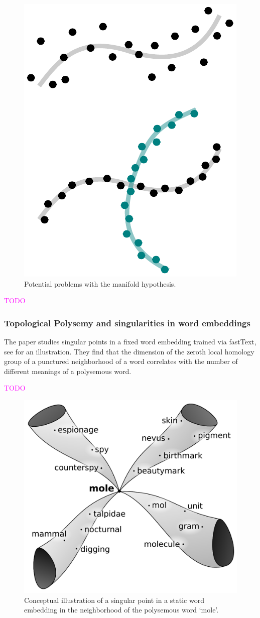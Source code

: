 \documentclass[11pt, a4paper]{amsart}
\begin{document}

\begin{figure}
	\centering
	\includegraphics[width=0.35\linewidth]{figures/topological_data_analysis/manifold_hypothesis_problems.pdf}
	\caption{
		Potential problems with the manifold hypothesis.
		\label{fig:manifold_hypothesis_problems}
	}
\end{figure}

\textcolor{magenta}{TODO}

\subsubsection{Topological Polysemy and singularities in word embeddings}

The paper \cite{jakubowski2020topology} studies singular points in a fixed word embedding trained via fastText, see  for an illustration.
They find that the dimension of the zeroth local homology group of a punctured neighborhood of a word correlates with the number of different meanings of a polysemous word.

\textcolor{magenta}{TODO}

\begin{figure}
	\centering
	\includegraphics[width=0.35\linewidth]{figures/topological_data_analysis/TPS_paper_screenshot}
	\caption{
		Conceptual illustration of a singular point in a static word embedding in the neighborhood of the polysemous word `mole'.
		\label{fig:TPS_paper_screenshot}
	}
\end{figure}
\end{document}
